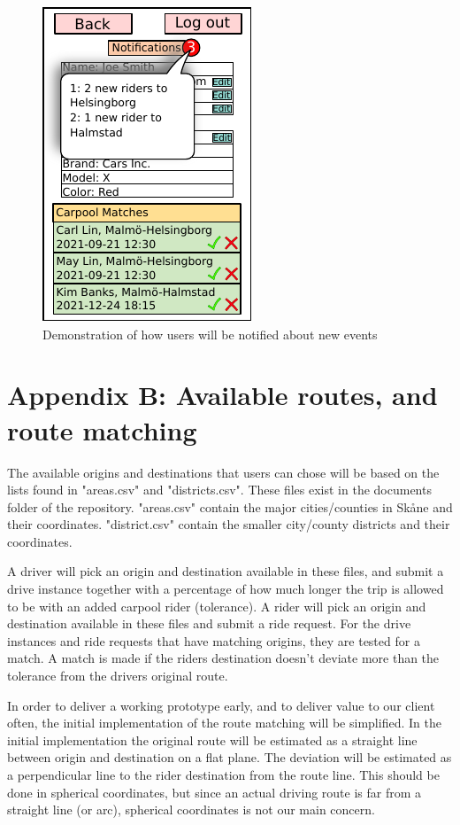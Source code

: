 \documentclass{article}
\begin{document}
\begin{figure}[!htpb]
\begin{minipage}{0.25\textwidth}
        \centering
        \includegraphics[scale=1]{prdFigures/profile3.pdf}
        \caption{Demonstration of how users will be notified about new events}
        \label{fig:profile3}
    \end{minipage}\hfill
\end{figure}

\newpage
\section{Appendix B: Available routes, and route matching}
The available origins and destinations that users can chose will be based on the lists found in "areas.csv" and "districts.csv". These files exist in the documents folder of the repository. "areas.csv" contain the major cities/counties in Skåne and their coordinates. "district.csv" contain the smaller city/county districts and their coordinates.

A driver will pick an origin and destination available in these files, and submit a drive instance together with a percentage of how much longer the trip is allowed to be with an added carpool rider (tolerance). A rider will pick an origin and destination available in these files and submit a ride request. For the drive instances and ride requests that have matching origins, they are tested for a match. A match is made if the riders destination doesn't deviate more than the tolerance from the drivers original route.

In order to deliver a working prototype early, and to deliver value to our client often, the initial implementation of the route matching will be simplified. In the initial implementation the original route will be estimated as a straight line between origin and destination on a flat plane. The deviation will be estimated as a perpendicular line to the rider destination from the route line. This should be done in spherical coordinates, but since an actual driving route is far from a straight line (or arc), spherical coordinates is not our main concern.
\end{document}

